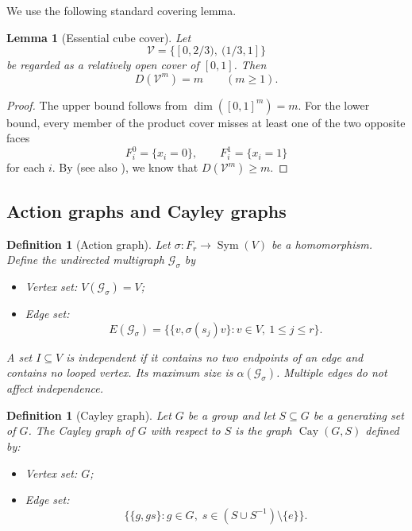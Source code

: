 \documentclass[12pt,a4paper]{amsart}
\newtheorem{lemma}[theorem]{Lemma}
\newtheorem{definition}[theorem]{Definition}
\theoremstyle{definition}
\newcommand{\Sym}{\operatorname{Sym}}
\newcommand{\ind}{\alpha}
\newcommand{\cG}{\mathcal G}
\newcommand{\cV}{\mathcal V}
\begin{document}
    We use the following standard covering lemma.
	
	\begin{lemma}[Essential cube cover]\label{lem:cube-cover}
		Let
		\[
		\cV=\{[0,2/3),\ (1/3,1]\}
		\]
		be regarded as a relatively open cover of $[0,1]$.  Then
		\[
		D(\cV^{m})=m
		\qquad(m\ge1).
		\]
	\end{lemma}
	
	\begin{proof}
		The upper bound follows from $\dim([0,1]^m)=m$.  For the lower bound, every member of the product cover misses at least one of the two opposite faces
		\[
		F_i^0=\{x_i=0\},\qquad F_i^1=\{x_i=1\}
		\]
		for each $i$. By \cite[Lemma 3.2]{LW00} (see also \cite[Theorem IV.2]{HW}), we know that $D(\cV^m)\ge m$.
	\end{proof}
	
	\subsection{Action graphs and Cayley graphs}
	\begin{definition}[Action graph]
	Let $\sigma:F_r\to\Sym(V)$ be a homomorphism.  Define the undirected multigraph $\cG_\sigma$ by

\begin{itemize}
    \item[(1)] Vertex set: $V(\cG_\sigma)=V$;
    \item[(2)] Edge set: 
    \[
    E(\cG_\sigma)=\{\{v,\sigma(s_j)v\}:v\in V,\ 1\le j\le r\}.
    \]
\end{itemize}

	A set $I\subseteq V$ is \emph{independent} if it contains no two endpoints of an edge and contains no looped vertex.  Its maximum size is $\ind(\cG_\sigma)$.  Multiple edges do not affect independence.
    \end{definition}
	\begin{definition}[Cayley graph]
Let $G$ be a group and let $S \subseteq G$ be a generating set of $G$. The \emph{Cayley graph} of $G$ with respect to $S$ is the graph $\operatorname{Cay}(G, S)$ defined by:
\begin{itemize}
    \item[(1)] Vertex set: $G$;
    \item[(2)] Edge set: 
    \[
    \bigl\{\{g, g s\} : g \in G,\; s \in (S \cup S^{-1}) \setminus \{e\}\bigr\}.
    \]
\end{itemize}
\end{definition}
	
\end{document}
